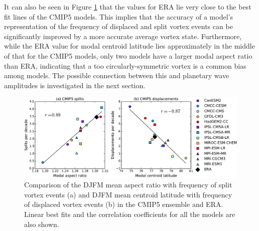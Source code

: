 It can also be seen in Figure \ref{fig:cmip5_moments_scatter} that the values
for ERA lie very close to the best fit lines of the CMIP5 models. This implies
that the accuracy of a model's representation of the frequency of displaced and
split vortex events can be significantly improved by a more accurate average
vortex state. Furthermore, while the ERA value for modal centroid latitude lies
approximately in the middle of that for the CMIP5 models, only two models have a
larger modal aspect ratio than ERA, indicating that a too circularly-symmetric
vortex is a common bias among models. The possible connection between this and
planetary wave amplitudes is investigated in the next section. 

\begin{figure}
 \centering
 \noindent\includegraphics[width=\textwidth]{figures/chapter-models/CMIP5_moments_scatter.pdf}
 \caption[Comparison of moment diagnostics and frequency of split and displaced
 vortex events.]{Comparison of the DJFM mean aspect ratio with frequency of
   split vortex events (a) and DJFM mean centroid latitude with frequency of
   displaced vortex events (b) in the CMIP5 ensemble and ERA. Linear best fits
   and the correlation coefficients for all the models are also shown.}
 \label{fig:cmip5_moments_scatter}
\end{figure}

